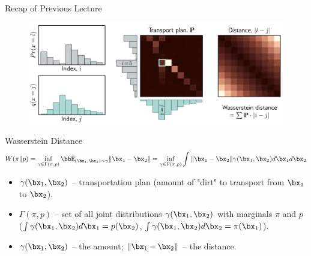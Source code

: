 \documentclass{beamer}
\begin{document}
\begin{frame}{Recap of Previous Lecture}
	\begin{figure}
		\centering
		\includegraphics[width=0.8\linewidth]{figs/discrete_wasserstein}
	\end{figure}
	\vspace{-0.3cm}
	\begin{block}{Wasserstein Distance}
		\vspace{-0.7cm}
		{\small
		\[
		W(\pi \| p) = \inf_{\gamma \in \Gamma(\pi, p)} \bbE_{(\bx_1, \bx_2) \sim \gamma} \| \bx_1 - \bx_2 \| =  \inf_{\gamma \in \Gamma(\pi, p)} \int \| \bx_1 - \bx_2 \| \gamma (\bx_1, \bx_2) d \bx_1 d \bx_2
		\]
		}
		\vspace{-0.5cm}
		\begin{itemize}
			\item $\gamma(\bx_1, \bx_2)$ -- transportation plan (amount of "dirt" to transport from $\bx_1$ to $\bx_2$).
			\item $\Gamma(\pi, p)$ -- set of all joint distributions $\gamma (\bx_1, \bx_2)$ with marginals $\pi$ and $p$ ($\int \gamma(\bx_1, \bx_2) d \bx_1 = p(\bx_2)$, $\int \gamma(\bx_1, \bx_2) d \bx_2 = \pi(\bx_1)$).
			\item $\gamma(\bx_1, \bx_2)$ -- the amount; $\|\bx_1 - \bx_2 \|$ -- the distance.
		\end{itemize}
	\end{block}
\end{frame}
\end{document}
